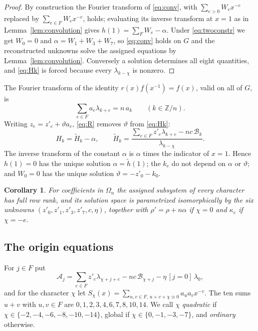 \documentclass{amsart}
\newtheorem{corollary}[theorem]{Corollary}
\theoremstyle{definition}
\theoremstyle{remark}
\numberwithin{equation}{section}
\newcommand{\ZZ}{\mathbb{Z}}
\begin{document}
\begin{proof}
By construction the Fourier transform of \eqref{eq:conv}, with $\sum_{e>0}W_ex^{-e}$
replaced by $\sum_{e\in F}W_ex^{-e}$, holds; evaluating its inverse transform at
$x=1$ as in Lemma~\ref{lem:convolution} gives
$h(1)=\sum_FW_e-\alpha$. Under \eqref{eq:twoconstr} we get $W_0=0$ and
$\alpha=W_1+W_3+W_7$, so \eqref{eq:conv} holds on $G$ and the reconstructed unknowns
solve the assigned equations by Lemma~\ref{lem:convolution}. Conversely a solution
determines all eight quantities, and \eqref{eq:Hk} is forced because every
$\lambda_{k-\chi}$ is nonzero.
\end{proof}

The Fourier transform of the identity $r(x)f(x^{-1})=f(x)$, valid on all of $G$, is
\begin{equation}\label{eq:R}
  \sum_{e\in F}a_e\lambda_{k+e}=n\,a_k\qquad(k\in\ZZ/n).
\end{equation}
Writing $z_e=z'_e+\vartheta a_e$, \eqref{eq:R} removes $\vartheta$ from
\eqref{eq:Hk}:
\begin{equation}\label{eq:Htilde}
  H_k=\tilde H_k-\alpha,\qquad
  \tilde H_k=\frac{\sum_{e\in F}z'_e\lambda_{k+e}-nc\,\mathcal B_k}{\lambda_{k-\chi}} .
\end{equation}
The inverse transform of the constant $\alpha$ is $\alpha$ times the indicator of
$x=1$. Hence $h(1)=0$ has the unique solution $\alpha=\tilde h(1)$; the $k_e$ do not
depend on $\alpha$ or $\vartheta$; and $W_0=0$ has the unique solution
$\vartheta=-z'_0-k_0$.

\begin{corollary}\label{cor:six}
For coefficients in $\Omega_n$ the assigned subsystem of every character has full
row rank, and its solution space is parametrized isomorphically by the six unknowns
$(z'_0,z'_1,z'_3,z'_7,c,\eta)$, together with $\rho'=\rho+n\alpha$ if $\chi=0$ and
$\kappa_e$ if $\chi=-e$.
\end{corollary}

\subsection{The origin equations}
For $j\in F$ put
\begin{equation}\label{eq:Aj}
  \mathcal A_j=\sum_{e\in F}z'_e\lambda_{\chi+j+e}-nc\,\mathcal B_{\chi+j}
     -\eta\,[j=0]\,\lambda_0 ,
\end{equation}
and for the character $\chi$ let
$S_\chi(x)=\sum_{u,v\in F,\,u+v+\chi\equiv0}a_ua_vx^{-v}$. The ten sums $u+v$ with
$u,v\in F$ are $0,1,2,3,4,6,7,8,10,14$. We call $\chi$ \emph{quadratic} if
$\chi\in\{-2,-4,-6,-8,-10,-14\}$, global if $\chi\in\{0,-1,-3,-7\}$, and
\emph{ordinary} otherwise.
\end{document}
